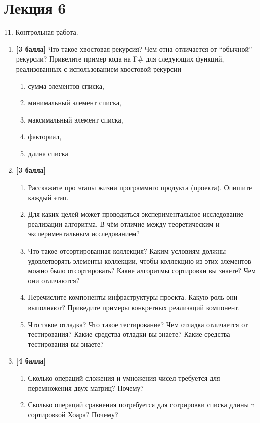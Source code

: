 \section{Лекция 6}
 
11. Контрольная работа.

\begin{enumerate}
	\item \textbf{[3 балла]} Что такое хвостовая рекурсия? Чем отна отличается от ``обычной'' рекурсии? Привелите пример кода на F\# для следующих функций, реализованных с использованием хвостовой рекурсии
	\begin{enumerate}
	    \item сумма элементов списка, 
	    \item минимальный элемент списка, 
	    \item максимальный элемент списка, 
	    \item факториал, 
	    \item длина списка
    \end{enumerate}
	\item \textbf{[3 балла]}
		\begin{enumerate}
		   \item Расскажите про этапы жизни программнго продукта (проекта). Опишите каждый этап.
           \item Для каких целей может проводиться экспериментальное исследование реализации алгоритма. В чём отличие между теоретическим и экспериментальным исследованием?
           \item Что такое отсортированная коллекция? Каким условиям должны удовлетворять элементы коллекции, чтобы коллекцию из этих элементов можно было отсортировать? Какие алгоритмы сортировки вы знаете? Чем они отличаются?
           \item Перечислите компоненты инфраструктуры проекта. Какую роль они выполняют? Приведите примеры конкретных реализаций  компонент.
           \item Что такое отладка? Что такое тестирование? Чем отладка отличается от тестирования? Какие средства отладки вы знаете? Какие средства тестирования вы знаете?
       \end{enumerate}
    \item \textbf{[4 балла]}
    	\begin{enumerate}
    	   \item Сколько операций сложения и умножения чисел требуется для перемножения двух матриц? Почему?
           \item Сколько операций сравнения потребуется для сотрировки списка длины n сортировкой Хоара? Почему?      

\end{enumerate}
\end{enumerate}
